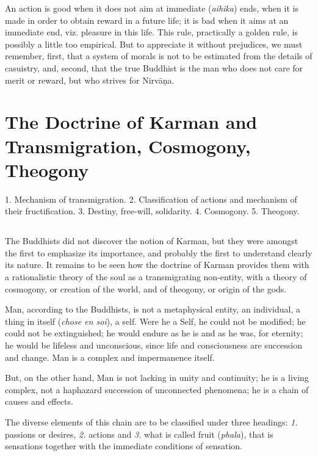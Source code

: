 \documentclass[a4paper, 11pt, oneside, english, landscape]{article}
\begin{document}
An action is good when it does not aim at immediate (\emph{aihika}) ends, when it is made in order to obtain reward in a future life; it is bad when it aims at an immediate end, viz. pleasure in this life. This rule, practically a golden rule, is possibly a little too empirical. But to appreciate it without prejudices, we must remember, first, that a system of morals is not to be estimated from the details of casuistry, and, second, that the true Buddhist is the man who does not care for merit or reward, but who strives for Nirvāṇa.
\clearpage
\section{The Doctrine of Karman and Transmigration, Cosmogony, Theogony}
\begin{center}\footnotesize
1. Mechanism of transmigration. 2. Classification of actions and mechanism of their fructification. 3. Destiny, free-will, solidarity. 4. Cosmogony. 5. Theogony.
\end{center}
\subsection{}
\paragraph{}
The Buddhists did not discover the notion of Karman, but they were amongst the first to emphasize its importance, and probably the first to understand clearly its nature. It remains to be seen how the doctrine of Karman provides them with a rationalistic theory of the soul as a transmigrating non-entity, with a theory of cosmogony, or creation of the world, and of theogony, or origin of the gods.

Man, according to the Buddhists, is not a metaphysical entity, an individual, a thing in itself (\emph{chose en soi}), a self. Were he a Self, he could not be modified; he could not be extinguished; he would endure as he is and as he was, for eternity; he would be lifeless and unconscious, since life and consciousness are succession and change. Man is a complex and impermanence itself.

But, on the other hand, Man is not lacking in unity and continuity; he is a living complex, not a haphazard succession of unconnected phenomena; he is a chain of causes and effects.

The diverse elements of this chain are to be classified under three headings: \emph{1.} passions or desires, \emph{2.} actions and \emph{3.} what is called fruit (\emph{phala}), that is sensations together with the immediate conditions of sensation.
\end{document}
